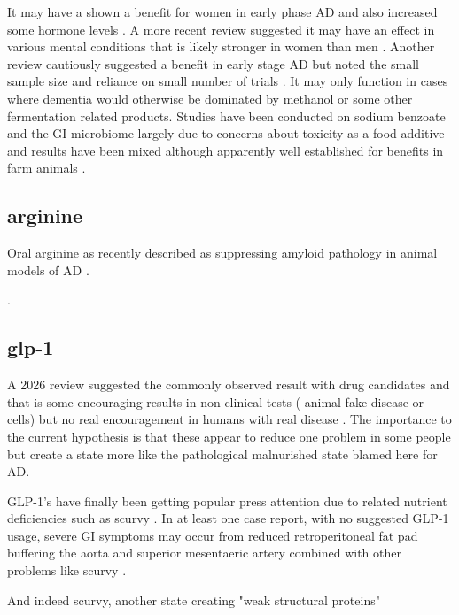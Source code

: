 It may have a shown a benefit for women in early phase
AD and  also increased some hormone levels
\cite{Lin_Chen_Wang_Effect_Sodium_Benzoate_2021}.
A more recent review suggested it may have an effect in various
mental conditions that is likely stronger in women than 
men
\cite{Liang_Cheng_Tseng_Effects_sodium_benzoate_2024}.
Another review cautiously suggested a benefit in early stage
AD but noted the small sample size and reliance on small number 
of trials 
\cite{Mansour_Ali_Ibrahim_Safety_efficacy_2025}.
It may only function in cases where dementia would otherwise
be dominated by methanol or some other fermentation related products.
Studies have been conducted on sodium benzoate and the GI microbiome
largely due to concerns about toxicity as a food additive
and results have been mixed although apparently well
established for benefits in farm animals
\cite{Lemons_Firrman_Mahalak_Effect_Sodium_2025}
\cite{Kluge_Broz_Eder_Effect_benzoic_acid_2006}.


\subsection{arginine}
Oral arginine as recently described as suppressing amyloid
pathology in animal models of AD
\cite{Fujii_Takeuchi_Fujino_Oral_administration_arginine_2025}.

.

\subsection{glp-1}


A 2026 review suggested the commonly observed result
with drug candidates and that is some encouraging
results in non-clinical tests ( animal fake disease or cells)
but no real encouragement in humans with real disease
\cite{PMID42014236}. The importance to the current hypothesis
is that these appear to reduce one problem in some people
but create a state more like the pathological malnurished
state blamed here for AD. 

GLP-1's have finally been getting popular press attention
due to related nutrient deficiencies such as scurvy
\cite{Shultz_People_2026}.
In at least one case report, with no suggested GLP-1 usage,
severe GI symptoms may occur from reduced retroperitoneal
fat pad buffering the aorta and superior mesentaeric
artery combined with other problems like scurvy \cite{PMC12865927}.


And indeed scurvy, another state creating "weak structural proteins"

